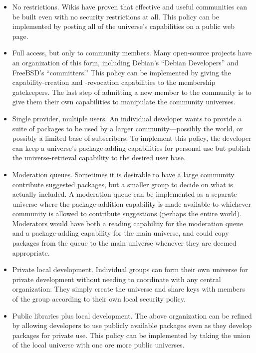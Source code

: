 \documentclass{article}
\begin{document}
\begin{itemize}
\item No restrictions.  Wikis have proven that effective and useful
      communities can be built even with no security restrictions at
      all.  This policy can be implemented by posting all of the
      universe's capabilities on a public web page.

\item Full access, but only to community members.  Many open-source
      projects have an organization of this form, including Debian's
      ``Debian Developers'' and FreeBSD's ``committers.''  This policy
      can be implemented by giving the capability-creation and
      -revocation capabilities to the membership gatekeepers.
      The last step of admitting a new member to the community is to
      give them their own capabilities to manipulate the community
      universes.

\item Single provider, multiple users.  An individual developer wants
      to provide a suite of packages to be used by a larger
      community---possibly the world, or possibly a limited base of
      subscribers.  To implement this policy, the developer can keep a
      universe's package-adding capabilities for personal use but
      publish the universe-retrieval capability to the desired
      user base.

\item Moderation queues.  Sometimes it is desirable to have a large
      community contribute suggested packages, but a smaller group to
      decide on what is actually included.  A moderation queue can be
      implemented as a separate universe where the package-addition
      capability is made available to whichever community is allowed
      to contribute suggestions (perhaps the entire world).
      Moderators would have both a reading capability for the
      moderation queue and a package-adding capability for the main
      universe, and could copy packages from the queue to the main
      universe whenever they are deemed appropriate.


\item Private local development.  Individual groups can form their own
      universe for private development without needing to coordinate
      with any central organization.  They simply create the universe
      and share keys with members of the group according to their
      own local security policy.

\item Public libraries plus local development.  The above organization
      can be refined by allowing developers to use publicly
      available packages even as they develop packages for private
      use.  This policy can be implemented by taking the union of the
      local universe with one ore more public universes.



\end{itemize}
\end{document}

